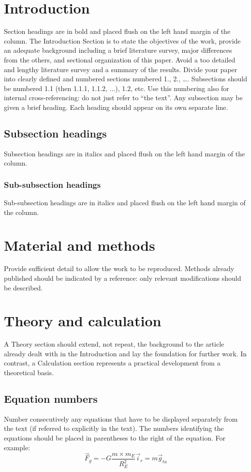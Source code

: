\documentclass[twocolumn, 10pt]{article}
\begin{document}
\section{Introduction}
Section headings are in bold and placed flush on the left hand margin of the column.
The Introduction Section is to state the objectives of the work, provide an adequate background including a brief literature survey, major differences from the others, and sectional organization of this paper. Avoid a too detailed and lengthy literature survey and a summary of the results.
Divide your paper into clearly defined and numbered sections numbered 1., 2., …. Subsections should be numbered 1.1 (then 1.1.1, 1.1.2, ...), 1.2, etc. Use this numbering also for internal cross-referencing: do not just refer to “the text”. Any subsection may be given a brief heading. Each heading should appear on its own separate line.

\subsection{Subsection headings}
Subsection headings are in italics and placed flush on the left hand margin of the column.

\subsubsection{Sub-subsection headings}
Sub-subsection headings are in italics and placed flush on the left hand margin of the column.

\section{Material and methods}
Provide sufficient detail to allow the work to be reproduced. Methods already published should be indicated by a reference: only relevant modifications should be described.

\section{Theory and calculation}
A Theory section should extend, not repeat, the background to the article already dealt with in the Introduction and lay the foundation for further work. In contrast, a Calculation section represents a practical development from a theoretical basis.

\subsection{Equation numbers}
Number consecutively any equations that have to be displayed separately from the text (if referred to explicitly in the text). The numbers identifying the equations should be placed in parentheses to the right of the equation. For example:
\begin{equation}
	{\vec F_g} = - G\frac{{m \times {m_E}}}{{R_E^2}}{\vec i_r} = m{\vec g_{ta}}
\end{equation}
\end{document}
